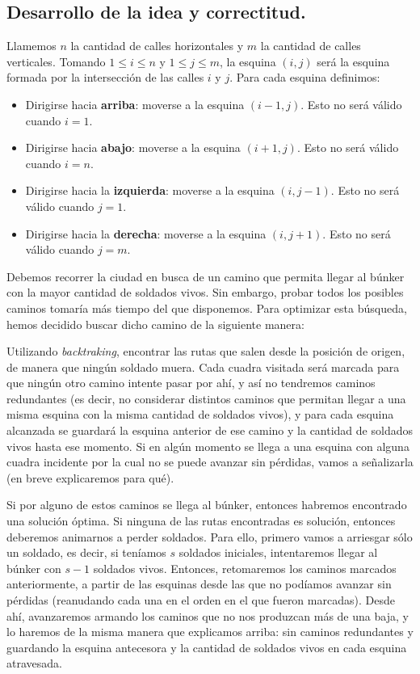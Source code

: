 \vspace*{0.6cm}

\subsection{Desarrollo de la idea y correctitud.}

\vspace*{0.3cm}

Llamemos $n$ la cantidad de calles horizontales y $m$ la cantidad de calles verticales.  Tomando $1 \leq i \leq n$ y $1 \leq j \leq m$, la esquina $(i,j)$ será la esquina formada por la intersección de las calles $i$ y $j$.  Para cada esquina definimos:

\begin{itemize}
	\item Dirigirse hacia {\bf arriba}: moverse a la esquina $(i-1,j)$. Esto no será válido cuando $i = 1$.
	\item Dirigirse hacia {\bf abajo}: moverse a la esquina $(i+1,j)$. Esto no será válido cuando $i = n$.
	\item Dirigirse hacia la {\bf izquierda}: moverse a la esquina $(i,j-1)$. Esto no será válido cuando $j = 1$.
	\item Dirigirse hacia la {\bf derecha}: moverse a la esquina $(i,j+1)$. Esto no será válido cuando $j = m$.
\end{itemize}

Debemos recorrer la ciudad en busca de un camino que permita llegar al búnker con la mayor cantidad de soldados vivos.  Sin embargo, probar todos los posibles caminos tomaría más tiempo del que disponemos.  Para optimizar esta búsqueda, hemos decidido buscar dicho camino de la siguiente manera:

Utilizando {\it backtraking}, encontrar las rutas que salen desde la posición de origen, de manera que ningún soldado muera.  Cada cuadra visitada será marcada para que ningún otro camino intente pasar por ahí, y así no tendremos caminos redundantes (es decir, no considerar distintos caminos que permitan llegar a una misma esquina con la misma cantidad de soldados vivos), y para cada esquina alcanzada se guardará la esquina anterior de ese camino y la cantidad de soldados vivos hasta ese momento.  Si en algún momento se llega a una esquina con alguna cuadra incidente por la cual no se puede avanzar sin pérdidas, vamos a señalizarla (en breve explicaremos para qué). 

Si por alguno de estos caminos se llega al búnker, entonces habremos encontrado una solución óptima.  Si ninguna de las rutas encontradas es solución, entonces deberemos animarnos a perder soldados.  Para ello, primero vamos a arriesgar sólo un soldado, es decir, si teníamos $s$ soldados iniciales, intentaremos llegar al búnker con $s-1$ soldados vivos. Entonces, retomaremos los caminos marcados anteriormente, a partir de las esquinas desde las que no podíamos avanzar sin pérdidas (reanudando cada una en el orden en el que fueron marcadas).  Desde ahí, avanzaremos armando los caminos que no nos produzcan más de una baja, y lo haremos de la misma manera que explicamos arriba: sin caminos redundantes y guardando la esquina antecesora y la cantidad de soldados vivos en cada esquina atravesada. 

